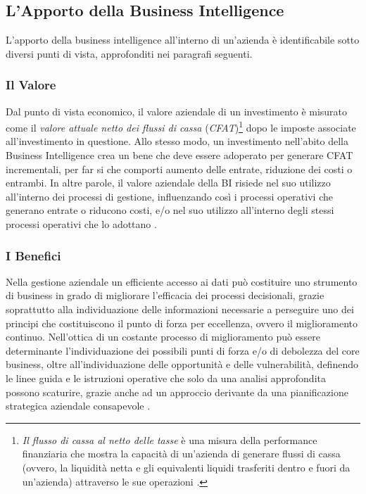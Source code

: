 \subsection{L'Apporto della Business Intelligence}

L'apporto della business intelligence all'interno di un'azienda è identificabile sotto diversi punti di vista, approfonditi nei paragrafi seguenti.

\subsubsection{Il Valore}

Dal punto di vista economico, il valore aziendale di un investimento è misurato come il \textit{valore attuale netto dei flussi di cassa} (\textit{CFAT})\footnote{\textit{Il flusso di cassa al netto delle tasse} è una misura della performance finanziaria che mostra la capacità di un'azienda di generare flussi di cassa (ovvero, la liquidità netta e gli equivalenti liquidi trasferiti dentro e fuori da un'azienda) attraverso le sue operazioni \cite{cfat_definition}.} dopo le imposte associate all'investimento in questione.
Allo stesso modo, un investimento nell'abito della Business Intelligence crea un bene che deve essere adoperato per generare CFAT incrementali, per far si che comporti aumento delle entrate, riduzione dei costi o entrambi. In altre parole, il valore aziendale della BI risiede nel suo utilizzo all'interno dei processi di gestione, influenzando così i processi operativi che generano entrate o riducono costi, e/o nel suo utilizzo all'interno degli stessi processi operativi che lo adottano \cite{decisionpath_bi_value}.

\subsubsection{I Benefici}

Nella gestione aziendale un efficiente accesso ai dati può costituire uno strumento di business in grado di migliorare l'efficacia dei processi decisionali, grazie soprattutto alla individuazione delle informazioni necessarie a perseguire uno dei principi che costituiscono il punto di forza per eccellenza, ovvero il miglioramento continuo. Nell'ottica di un costante processo di miglioramento può essere determinante l'individuazione dei possibili punti di forza e/o di debolezza del core business, oltre all'individuazione delle opportunità e delle vulnerabilità, definendo le linee guida e le istruzioni operative che solo da una analisi approfondita possono scaturire, grazie anche ad un approccio derivante da una pianificazione strategica aziendale consapevole \cite{dalla_bi_al_dw}.

